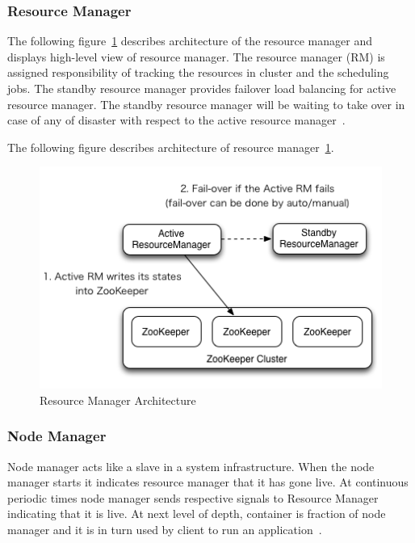 \subsubsection{Resource Manager}
The following figure~\ref{s:archires} describes 
architecture of the 
resource manager and displays high-level view of 
resource manager. The resource manager (RM) is assigned
responsibility of tracking the resources in cluster and 
the scheduling jobs. The standby resource manager provides 
failover load balancing for active resource manager. 
The standby resource manager will be waiting to take 
over in case of any of disaster with 
respect to the active resource manager~\cite{hid-sp18-412-YARN_Architecture}.

The following figure describes architecture 
of resource manager~\ref{s:archires}.

\begin{figure}[!ht]
\centering\includegraphics[width=\textwidth]{images/YARNResourceManager.png}
\caption{Resource 
Manager 
Architecture~\cite{hid-sp18-412-ResourceManager_Architecture}}\label{s:archires}
\end{figure}

\subsubsection{Node Manager}
Node manager acts like a slave in a 
system infrastructure. 
When the node manager starts it indicates resource manager 
that it has gone live. At continuous periodic times node manager
sends respective signals to Resource Manager indicating that it is live. 
At next level of depth, container is fraction of node manager 
and it is in turn used by 
client to run an application~\cite{hid-sp18-412-YARN_Hadoop_Internal}.

